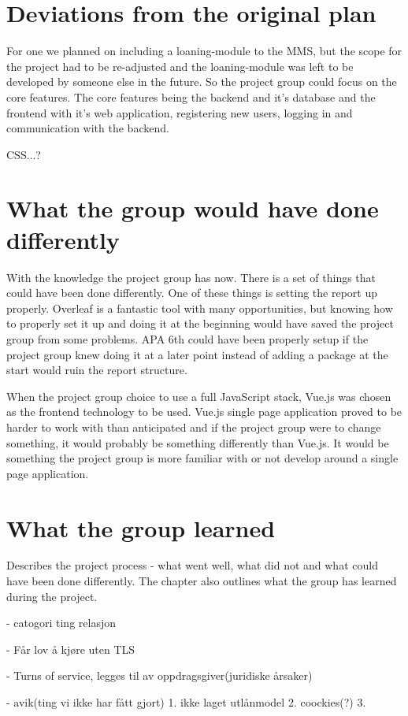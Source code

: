 \section{Deviations from the original plan}
For one we planned on including a loaning-module to the MMS, but the scope for the project had to be re-adjusted and the loaning-module was left to be developed by someone else in the future. So the project group could focus on the core features. The core features being the backend and it's database and the frontend with it's web application, registering new users, logging in and communication with the backend. 

CSS...?
\section{What the group would have done differently}
With the knowledge the project group has now. There is a set of things that could have been done differently. One of these things is setting the report up properly. Overleaf is a fantastic tool with many opportunities, but knowing how to properly set it up and doing it at the beginning would have saved the project group from some problems. APA 6th could have been properly setup if the project group knew doing it at a later point instead of adding a package at the start would ruin the report structure.

When the project group choice to use a full JavaScript stack, Vue.js was chosen as the frontend technology to be used. Vue.js single page application proved to be harder to work with than anticipated and if the project group were to change something, it would probably be something differently than Vue.js. It would be something the project group is more familiar with or not develop around a single page application.  

\section{What the group learned}


 
  



Describes the project process - what went well, what did not and what could have been done differently.
The chapter also outlines what the group has learned during the project.

- catogori ting relasjon

- Får lov å kjøre uten TLS

- Turns of service, legges til av oppdragsgiver(juridiske årsaker) 

- avik(ting vi ikke har fått gjort)
1. ikke laget utlånmodel
2. coockies(?)
3. 